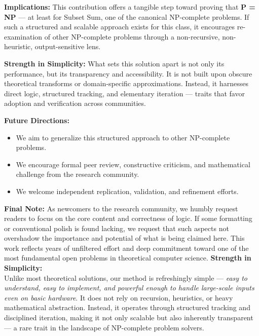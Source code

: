 \documentclass[11pt]{article}
\begin{document}
\vspace{1em}
\noindent\textbf{Implications:}  
This contribution offers a tangible step toward proving that \textbf{P = NP} — at least for Subset Sum, one of the canonical NP-complete problems. If such a structured and scalable approach exists for this class, it encourages re-examination of other NP-complete problems through a non-recursive, non-heuristic, output-sensitive lens.

\vspace{1em}
\noindent\textbf{Strength in Simplicity:}  
What sets this solution apart is not only its performance, but its transparency and accessibility. It is not built upon obscure theoretical transforms or domain-specific approximations. Instead, it harnesses direct logic, structured tracking, and elementary iteration — traits that favor adoption and verification across communities.

\vspace{10em}
\noindent\textbf{Future Directions:}
\begin{itemize}
    \item We aim to generalize this structured approach to other NP-complete problems.
    \item We encourage formal peer review, constructive criticism, and mathematical challenge from the research community.
    \item We welcome independent replication, validation, and refinement efforts.
\end{itemize}

\vspace{1em}
\noindent\textbf{Final Note:}  
As newcomers to the research community, we humbly request readers to focus on the core content and correctness of logic. If some formatting or conventional polish is found lacking, we request that such aspects not overshadow the importance and potential of what is being claimed here. This work reflects years of unfiltered effort and deep commitment toward one of the most fundamental open problems in theoretical computer science.
\vspace{1em}
\noindent\textbf{Strength in Simplicity:} \\
Unlike most theoretical solutions, our method is refreshingly simple — \textit{easy to understand, easy to implement, and powerful enough to handle large-scale inputs even on basic hardware}. It does not rely on recursion, heuristics, or heavy mathematical abstraction. Instead, it operates through structured tracking and disciplined iteration, making it not only scalable but also inherently transparent — a rare trait in the landscape of NP-complete problem solvers.
\end{document}
